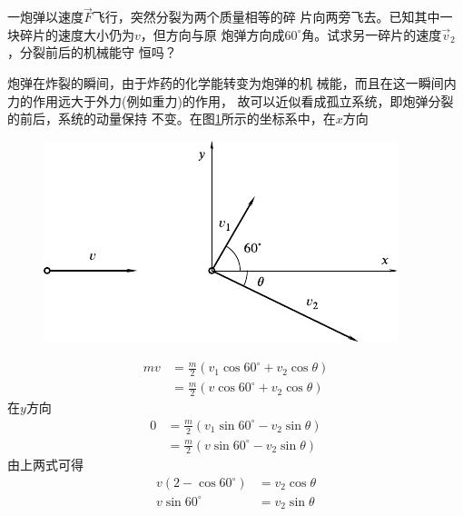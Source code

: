 \example 一炮弹以速度$ \vec { F } $飞行，突然分裂为两个质量相等的碎
片向两旁飞去。已知其中一块碎片的速度大小仍为$ v $，但方向与原
炮弹方向成$ 60 ^ { \circ } $角。试求另一碎片的速度$ \vec { v } _ { 2 } $，分裂前后的机械能守
恒吗？

\resolve 炮弹在炸裂的瞬间，由于炸药的化学能转变为炮弹的机
械能，而且在这一瞬间内力的作用远大于外力(例如重力)的作用，
故可以近似看成孤立系统，即炮弹分裂的前后，系统的动量保持
不变。在图\ref{fig:08.02}所示的坐标系中，在$ x $方向
\begin{figure}[h]
  \centering
  \includegraphics{figure/fig08.02}
  \caption{}
  \label{fig:08.02}
\end{figure}
\begin{equation*}
  \begin{split}
    m v &= \frac { m } { 2 } \left( v _ { 1 } \cos 60 ^ { \circ } + v _ { 2 } \cos \theta \right) \\
    &= \frac { m } { 2 } \left( v \cos 60 ^ { \circ } + v _ { 2 } \cos \theta \right)
  \end{split}
\end{equation*}
在$ y $方向
\begin{equation*}
  \begin{split}
    0 &= \frac { m } { 2 } \left( v _ { 1 } \sin 60 ^ { \circ } - v _ { 2 } \sin \theta \right) \\
    &= \frac { m } { 2 } \left( v \sin 60 ^ { \circ } - v _ { 2 } \sin \theta \right)
  \end{split}
\end{equation*}
由上两式可得
\begin{equation*}
  \begin{split}
    v \left( 2 - \cos 60 ^ { \circ } \right) &= v _ { 2 } \cos \theta \\
    v \sin 60 ^ { \circ } &= v _ { 2 } \sin \theta
  \end{split}
\end{equation*}
